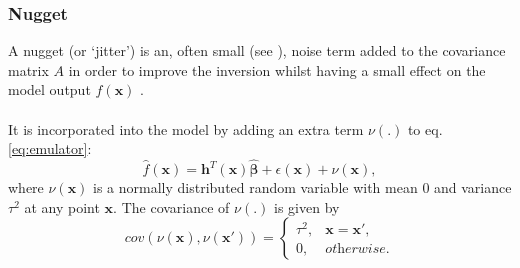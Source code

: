 \documentclass{article}
\newcommand{\simulator}{f}
\newcommand{\emulator}{\hat{f}}
\newcommand{\inputVec}{\mathbf{x}}
\newcommand{\basisFuncs}{\mathbf{h}}
\newcommand{\basisCoeffsEst}{\hat{\mathbf{\beta}}}
\newcommand{\cov}{cov}
\newcommand{\corrMatrix}{A}
\newcommand{\nug}{\nu}
\newcommand{\nugVar}{\tau^2}
\newcommand{\residual}{\epsilon}
\begin{document}
\subsubsection{Nugget}
\label{section:nugget}
A nugget (or `jitter') is an, often small (see \citet{Andrianakis2012,Baker2020}), noise term added to the covariance matrix $\corrMatrix$ in order to improve the inversion \citep{Andrianakis2012} whilst having a small effect on the model output $\simulator(\inputVec)$ \citep{Neal1997,Andrianakis2012}.\\\\
It is incorporated into the model by adding an extra term $\nug(.)$ to eq.\eqref{eq:emulator}:
\begin{equation}
    \label{eq:emulator-nugget}
    \emulator(\inputVec) = \basisFuncs^T(\inputVec) \basisCoeffsEst + \residual(\inputVec) + \nug(\inputVec),
\end{equation}
where $\nug(\inputVec)$ is a normally distributed random variable with mean $0$ and variance $\nugVar$ at any point $\inputVec$. The covariance of $\nug(.)$ is given by
\begin{equation}
    \nonumber
    \cov(\nug(\inputVec),\nug(\inputVec')) = 
    \begin{cases}
        \nugVar, & \inputVec = \inputVec', \\
        0, & {\textit{otherwise}}.
    \end{cases}
\end{equation}
\end{document}
